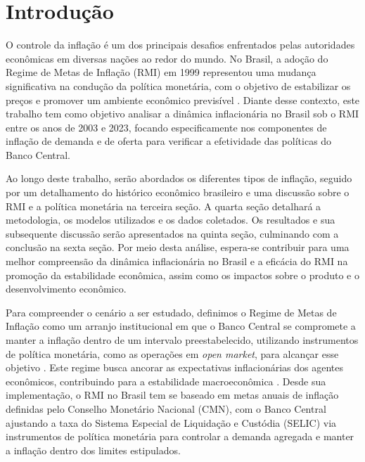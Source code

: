 \documentclass[12pt,oneside,a4paper,chapter=TITLE,english,brazil,sumario=abnt-6027-2012]{abntex2}
\begin{document}


\tableofcontents*
\cleardoublepage


\textual %
\pagestyle{simple}

\chapter{Introdução}

O controle da inflação é um dos principais desafios enfrentados pelas autoridades econômicas em diversas nações ao redor do mundo. No Brasil, a adoção do Regime de Metas de Inflação (RMI) em 1999 representou uma mudança significativa na condução da política monetária, com o objetivo de estabilizar os preços e promover um ambiente econômico previsível \cite{fraga_2003_inflation}. Diante desse contexto, este trabalho tem como objetivo analisar a dinâmica inflacionária no Brasil sob o RMI entre os anos de 2003 e 2023, focando especificamente nos componentes de inflação de demanda e de oferta para verificar a efetividade das políticas do Banco Central.

Ao longo deste trabalho, serão abordados os diferentes tipos de inflação, seguido por um detalhamento do histórico econômico brasileiro e uma discussão sobre o RMI e a política monetária na terceira seção. A quarta seção detalhará a metodologia, os modelos utilizados e os dados coletados. Os resultados e sua subsequente discussão serão apresentados na quinta seção, culminando com a conclusão na sexta seção. Por meio desta análise, espera-se contribuir para uma melhor compreensão da dinâmica inflacionária no Brasil e a eficácia do RMI na promoção da estabilidade econômica, assim como os impactos sobre o produto e o desenvolvimento econômico.

Para compreender o cenário a ser estudado, definimos o Regime de Metas de Inflação como um arranjo institucional em que o Banco Central se compromete a manter a inflação dentro de um intervalo preestabelecido, utilizando instrumentos de política monetária, como as operações em \textit{open market}, para alcançar esse objetivo \cite{svensson_1997_inflation}. Este regime busca ancorar as expectativas inflacionárias dos agentes econômicos, contribuindo para a estabilidade macroeconômica \cite{mishkin_2000_inflation}. Desde sua implementação, o RMI no Brasil tem se baseado em metas anuais de inflação definidas pelo Conselho Monetário Nacional (CMN), com o Banco Central ajustando a taxa do Sistema Especial de Liquidação e Custódia (SELIC) via instrumentos de política monetária para controlar a demanda agregada e manter a inflação dentro dos limites estipulados.
\end{document}

